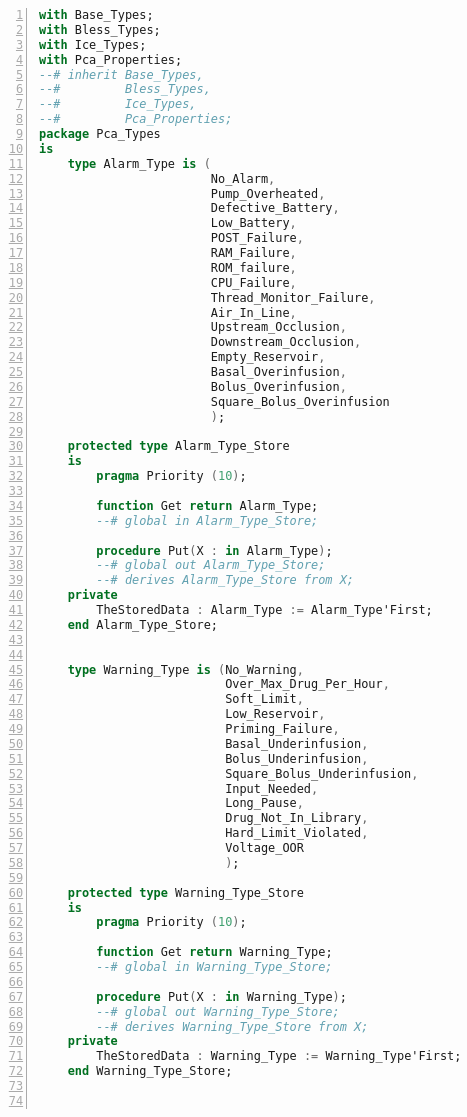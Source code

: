 \singlespacing
\begin{lstlisting}[language=ada, gobble=0, numbers=left, caption={\lstinline{Pca_Types} package}]
with Base_Types;
with Bless_Types;
with Ice_Types;
with Pca_Properties;
--# inherit Base_Types,
--#         Bless_Types,
--#         Ice_Types,
--#         Pca_Properties;
package Pca_Types
is
    type Alarm_Type is (
                        No_Alarm,
                        Pump_Overheated,
                        Defective_Battery,
                        Low_Battery,
                        POST_Failure,
                        RAM_Failure,
                        ROM_failure,
                        CPU_Failure,
                        Thread_Monitor_Failure,
                        Air_In_Line,
                        Upstream_Occlusion,
                        Downstream_Occlusion,
                        Empty_Reservoir,
                        Basal_Overinfusion,
                        Bolus_Overinfusion,
                        Square_Bolus_Overinfusion
                        );

    protected type Alarm_Type_Store
    is
        pragma Priority (10);

        function Get return Alarm_Type;
        --# global in Alarm_Type_Store;

        procedure Put(X : in Alarm_Type);
        --# global out Alarm_Type_Store;
        --# derives Alarm_Type_Store from X;
    private
        TheStoredData : Alarm_Type := Alarm_Type'First;
    end Alarm_Type_Store;


    type Warning_Type is (No_Warning,
                          Over_Max_Drug_Per_Hour,
                          Soft_Limit,
                          Low_Reservoir,
                          Priming_Failure,
                          Basal_Underinfusion,
                          Bolus_Underinfusion,
                          Square_Bolus_Underinfusion,
                          Input_Needed,
                          Long_Pause,
                          Drug_Not_In_Library,
                          Hard_Limit_Violated,
                          Voltage_OOR
                          );

    protected type Warning_Type_Store
    is
        pragma Priority (10);

        function Get return Warning_Type;
        --# global in Warning_Type_Store;

        procedure Put(X : in Warning_Type);
        --# global out Warning_Type_Store;
        --# derives Warning_Type_Store from X;
    private
        TheStoredData : Warning_Type := Warning_Type'First;
    end Warning_Type_Store;



\end{lstlisting}
